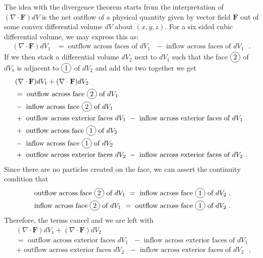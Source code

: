 The idea with the divergence theorem starts from the interpretation of $(\nabla \cdot \mathbf{F})dV$ is the net outflow of a physical quantity given by vector field $\mathbf{F}$ out of some convex differential volume $dV$ about $(x,y,z)$. For a six sided cubic differential volume, we may express this as:
\begin{align}
  ( \nabla \cdot \mathbf{F} ) dV_1 
  &= \text{ outflow across faces of $dV_1$  } - \text{ inflow across faces of $dV_1$  }  .
\end{align}
If we then stack a differential volume $dV_2$ next to $dV_1$ such that the face $\circled{2}$ of $dV_1$ is adjacent to $\circled{1}$ of $dV_2$ and add the two together we get
\begin{align}
  &( \nabla \cdot \mathbf{F} ) dV_1 + ( \nabla \cdot \mathbf{F} ) dV_2 \nonumber \\
  &= \text{ outflow across face \circled{2} of $dV_1$ } \nonumber \\
  &- \text{ inflow across face \circled{2} of $dV_1$ } \nonumber \\
  &+ \text{ outflow across exterior faces $dV_1$  } - \text{ inflow across exterior faces of $dV_1$  } \nonumber \\
  &+ \text{ outflow across face \circled{1} of $dV_2$  } \nonumber \\
  &- \text{ inflow across face \circled{1} of $dV_2$ } \nonumber \\
  &+ \text{ outflow across exterior faces $dV_2$  } - \text{ inflow across exterior faces of $dV_2$  } .
\end{align}
Since there are no particles created on the face, we can assert the continuity condition that
\begin{subequations}
\begin{align}
   &\text{ outflow across face \circled{2} of $dV_1$   } = \text{ inflow across face \circled{1} of $dV_2$ } , \\
   &\text{ inflow across face \circled{2} of $dV_1$   } = \text{ outflow across face \circled{1} of $dV_2$ } .
\end{align}
\end{subequations}
Therefore, the terms cancel and we are left with
\begin{align}
  &( \nabla \cdot \mathbf{F} ) dV_1 + ( \nabla \cdot \mathbf{F} ) dV_2 \nonumber \\
  &= \text{ outflow across exterior faces $dV_1$  } - \text{ inflow across exterior faces of $dV_1$  } \nonumber \\
  &+ \text{ outflow across exterior faces $dV_2$  } - \text{ inflow across exterior faces of $dV_2$  } .
\end{align}
